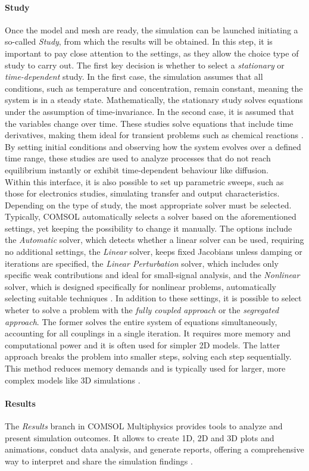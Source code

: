 \paragraph{Study}
Once the model and mesh are ready, the simulation can be launched initiating a
so-called \emph{Study}, from which the results will be obtained. In this step,
it is important to pay close attention to the settings, as they allow the choice
type of study to carry out. The first key decision is whether to select a
\emph{stationary} or \emph{time-dependent} study. In the first case, the
simulation assumes that all conditions, such as temperature and concentration,
remain constant, meaning the system is in a steady state. Mathematically, the
stationary study solves equations under the assumption of time-invariance. In
the second case, it is assumed that the variables change over time. These
studies solve equations that include time derivatives, making them ideal for
transient problems such as chemical reactions \citep{comsolCOMSOL_manual}. By
setting initial conditions and observing how the system evolves over a defined
time range, these studies are used to analyze processes that do not reach
equilibrium instantly or exhibit time-dependent behaviour like diffusion.\\
%
Within this interface, it is also possible to set up parametric sweeps, such as
those for electronics studies, simulating transfer and output characteristics.
\\
%
Depending on the type of study, the most appropriate solver must be selected.
Typically, COMSOL automatically selects a solver based on the aforementioned
settings, yet keeping the possibility to change it manually. The options include
the \emph{Automatic} solver, which detects whether a linear solver can be used,
requiring no additional settings, the \emph{Linear} solver, keeps fixed
Jacobians unless damping or iterations are specified, the \emph{Linear
Perturbation} solver, which includes only specific weak contributions and ideal
for small-signal analysis, and the \emph{Nonlinear} solver, which is designed
specifically for nonlinear problems, automatically selecting suitable techniques
\citep{comsolCOMSOL_manual}.
%
In addition to these settings, it is possible to select wheter to solve a
problem with the \emph{fully coupled approach} or the \emph{segregated
approach}. The former solves the entire system of equations simultaneously,
accounting for all couplings in a single iteration. It requires more memory and
computational power and it is often used for simpler 2D models. The latter
approach breaks the problem into smaller steps, solving each step sequentially.
This method reduces memory demands and is typically used for larger, more
complex models like 3D simulations \citep{comsolCOMSOL_manual}.

\paragraph{Results}
The \emph{Results} branch in COMSOL Multiphysics provides tools to analyze and
present simulation outcomes. It allows to create 1D, 2D and 3D plots and
animations, conduct data analysis, and generate reports, offering a
comprehensive way to interpret and share the simulation findings
\citep{comsolCOMSOL_manual}.